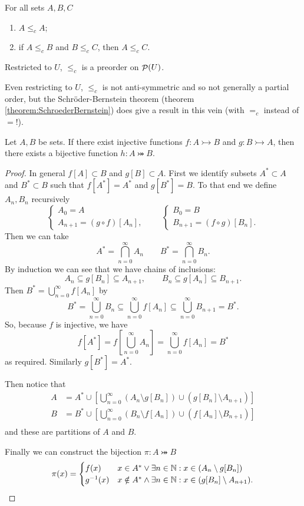 \begin{proposition}
For all sets $A,B,C$
\begin{enumerate}
\item $A\leq_c A$;
\item if $A\leq_c B$ and $B\leq_c C$, then $A\leq_c C$.
\end{enumerate}
Restricted to $U$, $\leq_c$ is a preorder on $\mathop{\mathcal{P}}(U)$.
\end{proposition}
Even restricting to $U$, $\leq_c$ is not anti-symmetric and so not generally a partial order, but the Schröder-Bernstein theorem (theorem \ref{theorem:SchroederBernstein}) does give a result in this vein (with $=_c$ instead of $=$!).

\begin{theorem} \label{theorem:SchroederBernstein}
Let $A, B$ be sets. If there exist injective functions $f: A\rightarrowtail B$ and $g: B\rightarrowtail A$, then there exists a bijective function $h: A\twoheadrightarrowtail B$.
\end{theorem}
\begin{proof}
In general $f[A]\subset B$ and $g[B]\subset A$. First we identify subsets $A^*\subset A$ and $B^*\subset B$ such that $f[A^*] = A^*$ and $g[B^*] = B$. To that end we define $A_n,B_n$ recursively
\[ \begin{cases}
A_0 = A \\ A_{n+1} = (g\circ f)[A_n],
\end{cases} \qquad \begin{cases}
B_0 = B \\ B_{n+1} = (f\circ g)[B_n].
\end{cases} \]
Then we can take
\[ A^* = \bigcap_{n=0}^\infty A_n \qquad B^* = \bigcap_{n=0}^\infty B_n. \]
By induction we can see that we have chains of inclusions:
\[ A_n\subseteq g[B_n] \subseteq A_{n+1}, \qquad B_n\subseteq g[A_n] \subseteq B_{n+1}. \]
Then $B^* = \bigcup_{n=0}^\infty f[A_n]$ by
\[ B^* = \bigcup_{n=0}^\infty B_n \subseteq \bigcup_{n=0}^\infty f[A_n]\subseteq \bigcup_{n=0}^\infty B_{n+1} = B^{*}. \]
So, because $f$ is injective, we have
\[ f[A^*] = f[\bigcup_{n=0}^\infty A_n] = \bigcup_{n=0}^\infty f[A_n] = B^* \]
as required. Similarly $g[B^*] = A^*$.

Then notice that
\begin{align*}
A &= A^* \cup \left[ \bigcup_{n=0}^\infty (A_n\setminus g[B_n])\cup (g[B_n]\setminus A_{n+1}) \right] \\
B &= B^* \cup \left[ \bigcup_{n=0}^\infty (B_n\setminus f[A_n])\cup (f[A_n]\setminus B_{n+1}) \right] \\
\end{align*}
and these are partitions of $A$ and $B$.

Finally we can construct the bijection $\pi: A\twoheadrightarrowtail B$
\[ \pi(x) = \begin{cases}
f(x) & x\in A^* \lor \exists n\in \mathbb{N}: x\in (A_n\setminus g[B_n]) \\
g^{-1}(x) & x\notin A^* \land \exists n\in \mathbb{N}: x\in (g[B_n]\setminus A_{n+1}).
\end{cases} \]
\end{proof}
